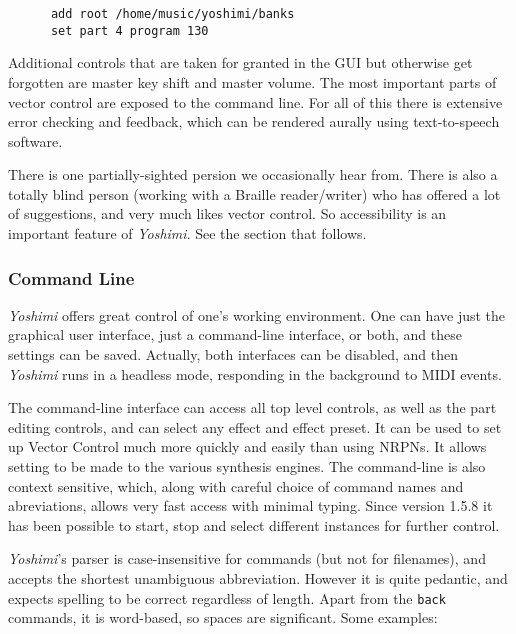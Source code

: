 \documentclass[
 11pt,
 twoside,
 a4paper,
 final                                 %
]{article}
\begin{document}
   \begin{verbatim}
      add root /home/music/yoshimi/banks
      set part 4 program 130
   \end{verbatim}

   Additional controls that are taken for granted in the GUI but
   otherwise get forgotten are master key shift and master volume.  The
   most important parts of vector control are exposed to the command line.
   For all of this there is extensive error checking and feedback, which can be
   rendered aurally using text-to-speech software.

   There is one partially-sighted persion we occasionally hear from. There
   is also a totally blind person (working with a Braille reader/writer) who has
   offered a lot of suggestions, and very much likes vector control.  So
   accessibility  is an important feature of
   \textsl{Yoshimi}.  See the section that follows.

\subsubsection{Command Line}
\label{subsubsec:new_features_command_line}

   \textsl{Yoshimi} offers great control of one's working environment.
   One can have just the graphical user interface, just a command-line
   interface, or both, and these settings can be saved.  Actually, both
   interfaces can be disabled, and then \textsl{Yoshimi} runs in a headless
   mode, responding in the background to MIDI events.

   The command-line interface can access all top level controls, as well as the
   part editing controls, and can select any effect and effect preset.  It can be
   used to set up Vector Control much more quickly and easily than using NRPNs.
   It allows setting to be made to the various synthesis engines.
   The command-line is also context sensitive, which, along with careful choice
   of command names and abreviations, allows very fast access with minimal
   typing. Since version 1.5.8 it has been possible to start, stop and select
   different instances for further control.

   \textsl{Yoshimi}'s parser is case-insensitive for commands (but not for
   filenames), and accepts the shortest unambiguous abbreviation. However it is
   quite pedantic, and expects spelling to be correct regardless of length.
   Apart from the \texttt{back} commands, it is word-based, so spaces are
   significant.
   Some examples:
\end{document}
